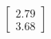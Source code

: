 \documentclass[preview]{standalone}
\begin{document}
\begin{align*}
\begin{bmatrix} 2.79 \\ 3.68 \end{bmatrix}
\end{align*}
\end{document}
